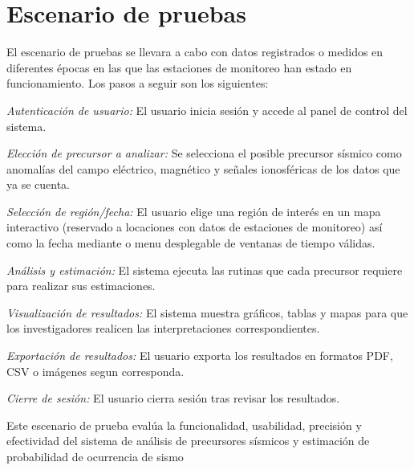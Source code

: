 \section{Escenario de pruebas}
El escenario de pruebas se llevara a cabo con datos registrados o medidos en diferentes épocas en las que las estaciones de monitoreo han estado en funcionamiento. Los pasos a seguir son los siguientes:

\textit{Autenticación de usuario:} El usuario inicia sesión y accede al panel de control del sistema.

\textit{Elección de precursor a analizar:} Se selecciona el posible precursor sísmico como anomalías del campo eléctrico, magnético y señales ionosféricas de los datos que ya se cuenta.

\textit{Selección de región/fecha:} El usuario elige una región de interés en un mapa interactivo (reservado a locaciones con datos de estaciones de monitoreo) así como la fecha mediante o menu desplegable de ventanas de tiempo válidas.

\textit{Análisis y estimación:} El sistema ejecuta las rutinas que cada precursor requiere para realizar sus estimaciones.

\textit{Visualización de resultados:} El sistema muestra gráficos, tablas y mapas para que los investigadores realicen las interpretaciones correspondientes.

\textit{Exportación de resultados:} El usuario exporta los resultados en formatos PDF, CSV o imágenes segun corresponda.

\textit{Cierre de sesión:} El usuario cierra sesión tras revisar los resultados.

Este escenario de prueba evalúa la funcionalidad, usabilidad, precisión y efectividad del sistema de análisis de precursores sísmicos y estimación de probabilidad de ocurrencia de sismo
\clearpage